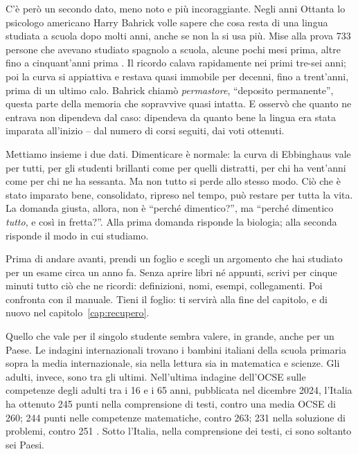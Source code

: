 C'è però un secondo dato, meno noto e più incoraggiante. Negli anni
Ottanta lo psicologo americano Harry Bahrick volle sapere che cosa resta
di una lingua studiata a scuola dopo molti anni, anche se non la si usa
più. Mise alla prova 733 persone che avevano studiato spagnolo a scuola,
alcune pochi mesi prima, altre fino a cinquant'anni prima
\parencite{bahrick1984}. Il ricordo calava rapidamente nei primi tre-sei
anni; poi la curva si appiattiva e restava quasi immobile per decenni,
fino a trent'anni, prima di un ultimo calo. Bahrick
chiamò \emph{permastore}, \enquote{deposito permanente}, questa parte
della memoria che sopravvive quasi intatta. E osservò che quanto ne
entrava non dipendeva dal caso: dipendeva da quanto bene la lingua era
stata imparata all'inizio -- dal numero di corsi seguiti, dai voti
ottenuti.

Mettiamo insieme i due dati. Dimenticare è normale: la curva di
Ebbinghaus vale per tutti, per gli studenti brillanti come per quelli
distratti, per chi ha vent'anni come per chi ne ha sessanta. Ma non
tutto si perde allo stesso modo. Ciò che è stato imparato bene,
consolidato, ripreso nel tempo, può restare per tutta la vita. La
domanda giusta, allora, non è \enquote{perché dimentico?}, ma
\enquote{perché dimentico \emph{tutto}, e così in fretta?}. Alla prima
domanda risponde la biologia; alla seconda risponde il modo in cui
studiamo.

\begin{esercizio}
Prima di andare avanti, prendi un foglio e scegli un argomento che hai
studiato per un esame circa un anno fa. Senza aprire libri né appunti,
scrivi per cinque minuti tutto ciò che ne ricordi: definizioni, nomi,
esempi, collegamenti. Poi confronta con il manuale. Tieni il foglio: ti
servirà alla fine del capitolo, e di nuovo nel capitolo~\ref{cap:recupero}.
\end{esercizio}

Quello che vale per il singolo studente sembra valere, in grande, anche
per un Paese. Le indagini internazionali trovano i bambini italiani
della scuola primaria sopra la media internazionale, sia nella lettura
sia in matematica e scienze. Gli adulti, invece, sono tra gli ultimi.
Nell'ultima indagine dell'OCSE sulle competenze degli adulti tra i 16 e
i 65 anni, pubblicata nel dicembre 2024, l'Italia ha ottenuto 245 punti
nella comprensione di testi, contro una media OCSE di 260; 244 punti
nelle competenze matematiche, contro 263; 231 nella soluzione di
problemi, contro 251 \parencite{oecd2024piaac}. Sotto l'Italia, nella
comprensione dei testi, ci sono soltanto sei Paesi.

